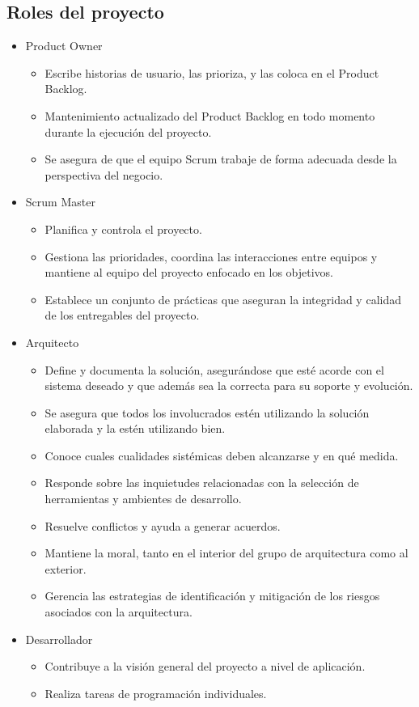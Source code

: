 \documentclass[a4paper,oneside,10pt]{article}
\begin{document}
\subsection{Roles del proyecto}

\begin{itemize}
\item Product Owner
\begin{itemize}
\item Escribe historias de usuario, las prioriza, y las coloca en el Product Backlog.
\item Mantenimiento actualizado del Product Backlog en todo momento durante la ejecución del proyecto.
\item Se asegura de que el equipo Scrum trabaje de forma adecuada desde la perspectiva del negocio.
\end{itemize}
\item Scrum Master
\begin{itemize}
\item Planifica y controla el proyecto.
\item Gestiona las prioridades, coordina las interacciones entre equipos y mantiene al equipo del proyecto enfocado en los objetivos.
\item Establece un conjunto de prácticas que aseguran la integridad y calidad de los entregables del proyecto.
\end{itemize}
\item Arquitecto
\begin{itemize}
\item Define y documenta la solución, asegurándose que esté acorde con el sistema deseado y que además sea la correcta para su soporte y evolución.
\item Se asegura que todos los involucrados estén utilizando la solución elaborada y la estén utilizando bien.
\item Conoce cuales cualidades sistémicas deben alcanzarse y en qué medida.
\item Responde sobre las inquietudes relacionadas con la selección de herramientas y ambientes de desarrollo.
\item Resuelve conflictos y ayuda a generar acuerdos.
\item Mantiene la moral, tanto en el interior del grupo de arquitectura como al exterior.
\item Gerencia las estrategias de identificación y mitigación de los riesgos asociados con la arquitectura.
\end{itemize}
\item Desarrollador
\begin{itemize}
\item Contribuye a la visión general del proyecto a nivel de aplicación.
\item Realiza tareas de programación individuales.
\end{itemize}
\end{itemize}
\end{document}
